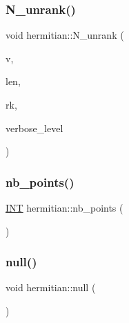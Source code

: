 \subsubsection{\texorpdfstring{N\+\_\+unrank()}{N\_unrank()}}
{\footnotesize\ttfamily void hermitian\+::\+N\+\_\+unrank (\begin{DoxyParamCaption}\item[{\mbox{\hyperlink{galois_8h_a09fddde158a3a20bd2dcadb609de11dc}{I\+NT}} $\ast$}]{v,  }\item[{\mbox{\hyperlink{galois_8h_a09fddde158a3a20bd2dcadb609de11dc}{I\+NT}}}]{len,  }\item[{\mbox{\hyperlink{galois_8h_a09fddde158a3a20bd2dcadb609de11dc}{I\+NT}}}]{rk,  }\item[{\mbox{\hyperlink{galois_8h_a09fddde158a3a20bd2dcadb609de11dc}{I\+NT}}}]{verbose\+\_\+level }\end{DoxyParamCaption})}

\mbox{\label{classhermitian_aa219f147fb0f1224113ad58e4d5d8b03}} 
\subsubsection{\texorpdfstring{nb\+\_\+points()}{nb\_points()}}
{\footnotesize\ttfamily \mbox{\hyperlink{galois_8h_a09fddde158a3a20bd2dcadb609de11dc}{I\+NT}} hermitian\+::nb\+\_\+points (\begin{DoxyParamCaption}{ }\end{DoxyParamCaption})}

\mbox{\label{classhermitian_a03a8d7165fea9af79897a189d03103d7}} 
\subsubsection{\texorpdfstring{null()}{null()}}
{\footnotesize\ttfamily void hermitian\+::null (\begin{DoxyParamCaption}{ }\end{DoxyParamCaption})}

\mbox{\label{classhermitian_a01480e5ab970fdf5257c965d38992bdf}} 
